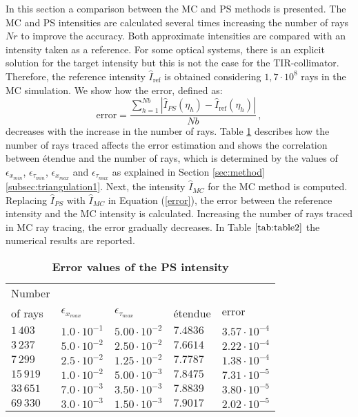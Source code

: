 In this section a comparison between the MC and PS methods is presented.
The MC and PS intensities are calculated several times increasing the number of rays $Nr$ to improve the accuracy.
Both approximate intensities are compared with an intensity taken as a reference.
For some optical systems, there is an explicit solution for the target intensity but this is not the case for the TIR-collimator.
Therefore, the reference intensity $\hat{I}_{\mbox{ref}}$ is obtained considering $1,7 \cdot 10^8$ rays in the MC simulation.
We show how the error,
defined as:
\begin{equation}\label{error}
\mbox{error} = \frac{\sum_{h = 1}^{Nb}| \hat{I}_{PS}(\eta_h) - \hat{I}_{\mbox{ref}}(\eta_h)|}{Nb}\,,
\end{equation}
decreases with the increase in the number of rays.
Table \ref{tab:table} describes how the number of rays traced affects the error estimation and shows the correlation between \'{e}tendue and the number of rays, which is
determined by the values of $\epsilon_{x_{min}}$, $\epsilon_{\tau_{min}}$, $\epsilon_{x_{max}}$ and $\epsilon_{\tau_{max}}$ as explained in Section \ref{sec:method}\ref{subsec:triangulation1}.
 Next, the intensity  $\hat{I}_{MC}$ for the MC method is computed.
Replacing $\hat{I}_{PS}$ with $\hat{I}_{MC}$ in Equation (\ref{error}), the error between the reference intensity and the MC intensity is calculated.
Increasing the number of rays traced in MC ray tracing, the error gradually decreases.
In Table $\ref{tab:table2}$ the numerical results are reported.
\begin{table}[htbp] \label{tab:table}
\centering
\caption{\bf Error values of the PS intensity}
\begin{tabular}{lllll}
 \hline  Number \\ of rays\;   & $\epsilon_{x_{max}} $   \;  & $\epsilon_{\tau_{max}}$\; & \'{e}tendue  & $\mbox{error}$\\
  \hline $1\,403$  & $1.0\cdot 10^{-1}$   & $5.00\cdot 10^{-2}$ & $7.4836$ & $3.57\cdot10^{-4}$ \\
$3\,237$    & $5.0\cdot 10^{-2}$    & $2.50\cdot 10^{-2}$ & $7.6614$ & $2.22\cdot10^{-4}$  \\
$7\,299$   & $2.5 \cdot 10^{-2}$    & $1.25\cdot 10^{-2}$ & $7.7787$ & $1.38\cdot 10^{-4}$ \\
 $15\,919$    & $1.0\cdot 10^{-2}$   & $5.00 \cdot 10^{-3}$ & $7.8475$ & $7.31\cdot 10^{-5}$ \\
 $33\,651$   & $7.0\cdot 10^{-3}$   & $3.50 \cdot 10^{-3}$ & $7.8839$ & $3.80\cdot 10^{-5}$ \\
 $69\,330$  & $3.0\cdot 10^{-3}$    & $1.50 \cdot 10^{-3}$ & $7.9017$ & $2.02\cdot 10^{-5}$ \\
 \hline
 \end{tabular}
 \label{tab:table}
 \end{table}

